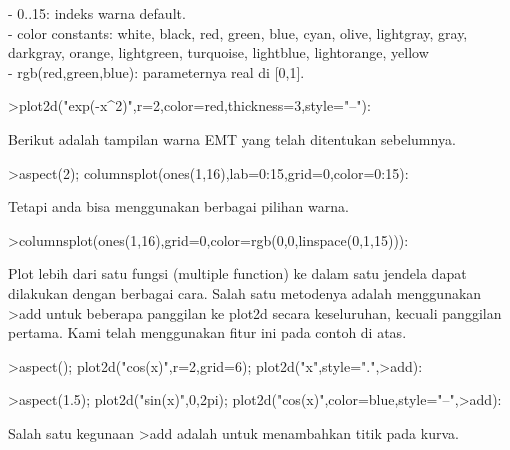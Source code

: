 \documentclass{article}
\begin{document}
\begin{eulernotebook}
\begin{eulercomment}
\begin{eulercomment}
\begin{eulercomment}
\begin{eulercomment}
\begin{eulercomment}
- 0..15: indeks warna default.\\
- color constants: white, black, red, green, blue, cyan, olive,
lightgray, gray, darkgray, orange, lightgreen, turquoise, lightblue,
lightorange, yellow\\
- rgb(red,green,blue): parameternya real di [0,1].
\end{eulercomment}
\begin{eulerprompt}
>plot2d("exp(-x^2)",r=2,color=red,thickness=3,style="--"):
\end{eulerprompt}
\begin{eulercomment}
Berikut adalah tampilan warna EMT yang telah ditentukan sebelumnya.
\end{eulercomment}
\begin{eulerprompt}
>aspect(2); columnsplot(ones(1,16),lab=0:15,grid=0,color=0:15):
\end{eulerprompt}
\begin{eulercomment}
Tetapi anda bisa menggunakan berbagai pilihan warna.
\end{eulercomment}
\begin{eulerprompt}
>columnsplot(ones(1,16),grid=0,color=rgb(0,0,linspace(0,1,15))):
\end{eulerprompt}
\begin{eulercomment}
Plot lebih dari satu fungsi (multiple function) ke dalam satu jendela
dapat dilakukan dengan berbagai cara. Salah satu metodenya adalah
menggunakan \textgreater{}add untuk beberapa panggilan ke plot2d secara
keseluruhan, kecuali panggilan pertama. Kami telah menggunakan fitur
ini pada contoh di atas.
\end{eulercomment}
\begin{eulerprompt}
>aspect(); plot2d("cos(x)",r=2,grid=6); plot2d("x",style=".",>add):
\end{eulerprompt}
\begin{eulerprompt}
>aspect(1.5); plot2d("sin(x)",0,2pi); plot2d("cos(x)",color=blue,style="--",>add):
\end{eulerprompt}
\begin{eulercomment}
Salah satu kegunaan \textgreater{}add adalah untuk menambahkan titik pada kurva.

\end{eulercomment}
\end{eulercomment}
\end{eulercomment}
\end{eulercomment}
\end{eulercomment}
\end{eulernotebook}
\end{document}
